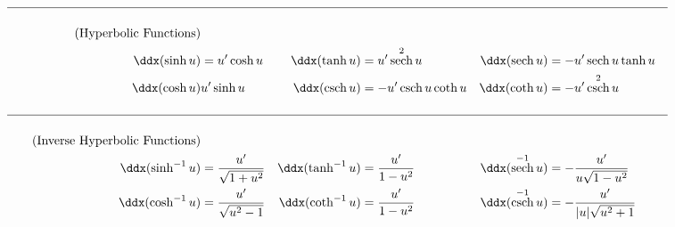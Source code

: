 \documentclass{book}
\DeclareMathOperator{\sech}{sech}
\DeclareMathOperator{\csch}{csch}
\begin{document}
\begin{appendices}
\begin{align}
\hline\nonumber\\\tag{Hyperbolic Functions}\\
\nonumber \ddx(\sinh u) &= u'\cosh u & \ddx(\tanh u) &= u'\sech^2u & \ddx(\sech u) &= -u'\sech u\tanh u \\
\nonumber \ddx(\cosh u) & u'\sinh u & \ddx(\csch u) &= -u'\csch u\coth u & \ddx(\coth u) &= -u'\csch^2 u\\\nonumber\\
\hline\nonumber\\\tag{Inverse Hyperbolic Functions}\\
\nonumber \ddx(\sinh^{-1} u) &= \dfrac{u'}{\sqrt{1+u^2}} & \ddx(\tanh^{-1} u) &= \dfrac{u'}{1-u^2}& \ddx(\sech^{-1} u) &= -\dfrac{u'}{u\sqrt{1-u^2}}\\
\nonumber \ddx(\cosh^{-1} u) &= \dfrac{u'}{\sqrt{u^2-1}} &\ddx(\coth^{-1} u) &= \dfrac{u'}{1-u^2} &  \ddx(\csch^{-1} u) &= -\dfrac{u'}{|u|\sqrt{u^2+1}}
\end{align}

\end{appendices}
\end{document}
